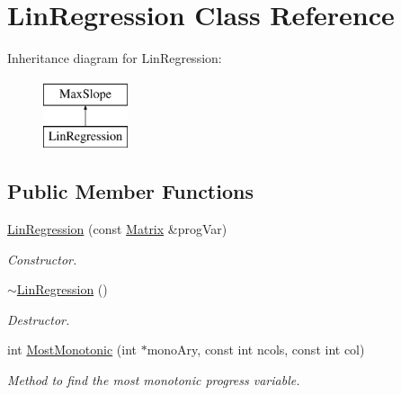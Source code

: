\hypertarget{classLinRegression}{
\section{LinRegression Class Reference}
\label{de/d89/classLinRegression}
}
Inheritance diagram for LinRegression:\begin{figure}[H]
\begin{center}
\leavevmode
\includegraphics[height=2cm]{de/d89/classLinRegression}
\end{center}
\end{figure}
\subsection*{Public Member Functions}
\begin{DoxyCompactItemize}
\item 
\hyperlink{classLinRegression_a0d747e38f7a8997765be15f43062290c}{LinRegression} (const \hyperlink{classMatrix}{Matrix} \&progVar)
\begin{DoxyCompactList}\small\item\em Constructor. \item\end{DoxyCompactList}\item 
\hypertarget{classLinRegression_a4ea5ffb8032172bdf54d1f2d4041d520}{
\hyperlink{classLinRegression_a4ea5ffb8032172bdf54d1f2d4041d520}{$\sim$LinRegression} ()}
\label{de/d89/classLinRegression_a4ea5ffb8032172bdf54d1f2d4041d520}

\begin{DoxyCompactList}\small\item\em Destructor. \item\end{DoxyCompactList}\item 
int \hyperlink{classLinRegression_a1f245c4e47637f3f1d94f6129861406d}{MostMonotonic} (int $\ast$monoAry, const int ncols, const int col)
\begin{DoxyCompactList}\small\item\em Method to find the most monotonic progress variable. \item\end{DoxyCompactList}\end{DoxyCompactItemize}


